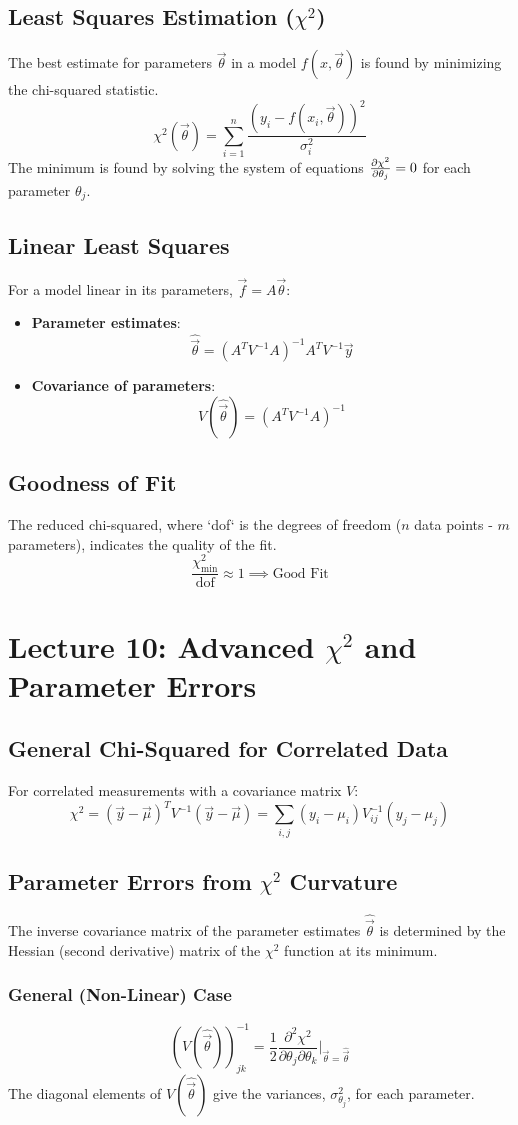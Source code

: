 \documentclass[10pt, twocolumn]{article}
\begin{document}
\subsection{Least Squares Estimation ($\chi^2$)}
The best estimate for parameters $\vec{\theta}$ in a model $f(x, \vec{\theta})$ is found by minimizing the chi-squared statistic.
\[ \chi^2(\vec{\theta}) = \sum_{i=1}^{n} \frac{(y_i - f(x_i, \vec{\theta}))^2}{\sigma_i^2} \]
The minimum is found by solving the system of equations $\pdv{\chi^2}{\theta_j} = 0$ for each parameter $\theta_j$.

\subsection{Linear Least Squares}
For a model linear in its parameters, $\vec{f} = A \vec{\theta}$:
\begin{itemize}
    \item \textbf{Parameter estimates}:
          \[ \hat{\vec{\theta}} = (A^T V^{-1} A)^{-1} A^T V^{-1} \vec{y} \]
    \item \textbf{Covariance of parameters}:
          \[ V(\hat{\vec{\theta}}) = (A^T V^{-1} A)^{-1} \]
\end{itemize}

\subsection{Goodness of Fit}
The reduced chi-squared, where `dof` is the degrees of freedom ($n$ data points - $m$ parameters), indicates the quality of the fit.
\[ \frac{\chi^2_{\text{min}}}{\text{dof}} \approx 1 \implies \text{Good Fit} \]

\section{Lecture 10: Advanced $\chi^2$ and Parameter Errors}

\subsection{General Chi-Squared for Correlated Data}
For correlated measurements with a covariance matrix $V$:
\[ \chi^2 = (\vec{y} - \vec{\mu})^T V^{-1} (\vec{y} - \vec{\mu}) = \sum_{i,j} (y_i - \mu_i) V^{-1}_{ij} (y_j - \mu_j) \]

\subsection{Parameter Errors from $\chi^2$ Curvature}
The inverse covariance matrix of the parameter estimates $\hat{\vec{\theta}}$ is determined by the Hessian (second derivative) matrix of the $\chi^2$ function at its minimum.

\subsubsection{General (Non-Linear) Case}
\[ (V(\hat{\vec{\theta}}))^{-1}_{jk} = \frac{1}{2} \frac{\partial^2 \chi^2}{\partial \theta_j \partial \theta_k} \Bigg|_{\vec{\theta} = \hat{\vec{\theta}}} \]
The diagonal elements of $V(\hat{\vec{\theta}})$ give the variances, $\sigma^2_{\theta_j}$, for each parameter.
\end{document}
